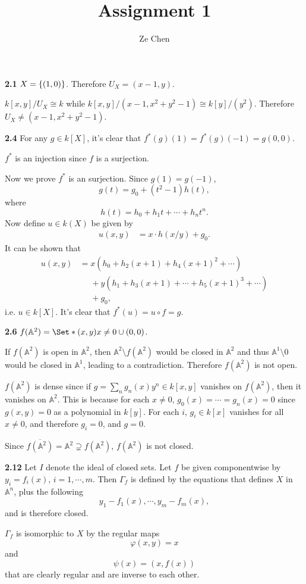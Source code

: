 \documentclass{article}
\title{Assignment 1}
\author{Ze Chen}
\makeatletter
\newcommand*{\shifttext}[1]{%
  \settowidth{\@tempdima}{#1}%
  \hspace{-\@tempdima}#1%
}
\newcommand{\plabel}[1]{%
\shifttext{\textbf{#1}\quad}%
}
\makeatother
\begin{document}
\maketitle

\plabel{2.1}%
$X = \qty{(1,0)}$.
Therefore $U_X = (x-1,y)$.
\par
$k[x,y]/U_X \cong k$ while $k[x,y]/(x-1, x^2+y^2-1) \cong k[y]/(y^2)$.
Therefore $U_X \neq (x-1,x^2+y^2-1)$.

\plabel{2.4}%
For any $g\in k[X]$, it's clear that $f^*(g)(1) = f^*(g)(-1) = g(0,0)$.
\par
$f^*$ is an injection since $f$ is a surjection.
\par
Now we prove $f^*$ is an surjection.
Since $g(1) = g(-1)$,
\[ g(t) = g_0 + (t^2 - 1)h(t), \]
where
\[ h(t) = h_0 + h_1 t + \cdots + h_n t^n. \]
Now define $u\in k(X)$ be given by
\begin{align*}
    u(x,y) &= x \cdot h(x/y) + g_0.
\end{align*}
It can be shown that
\begin{align*}
    u(x,y) &= x(h_0 + h_2(x+1) + h_4(x+1)^2 + \cdots) \\
    &\phantom{{}={}} + y(h_1 + h_3(x+1) + \cdots + h_5(x+1)^3 + \cdots) \\
    &\phantom{{}={}} + g_0,
\end{align*}
i.e. $u\in k[X]$.
It's clear that $f^*(u) = u\circ f = g$.

\plabel{2.6}%
$f(\mathbb{A}^2) = \Set*{(x,y)}{x\neq 0} \cup (0,0)$.
\par
If $f(\mathbb{A}^2)$ is open in $\mathbb{A}^2$, then $\mathbb{A}^2 \setminus f(\mathbb{A}^2)$ would be closed in $\mathbb{A}^2$ and thus $\mathbb{A}^1 \setminus \qty{0}$ would be closed in $\mathbb{A}^1$, leading to a contradiction.
Therefore $f(\mathbb{A}^2)$ is not open.
\par
$f(\mathbb{A}^2)$ is dense since if $g = \sum_n g_n(x) y^n\in k[x,y]$ vanishes on $f(\mathbb{A}^2)$, then it vanishes on $\mathbb{A}^2$.
This is because for each $x\neq 0$, $g_0(x) = \cdots = g_n(x) = 0$ since $g(x,y) = 0$ as a polynomial in $k[y]$.
For each $i$, $g_i\in k[x]$ vanishes for all $x\neq 0$, and therefore $g_i = 0$, and $g=0$.
\par
Since $\overline{f(\mathbb{A}^2)} = \mathbb{A}^2 \supsetneq f(\mathbb{A}^2)$, $f(\mathbb{A}^2)$ is not closed.

\plabel{2.12}%
Let $I$ denote the ideal of closed sets.
Let $f$ be given componentwise by $y_i = f_i(x)$, $i=1,\cdots,m$.
Then $\Gamma_f$ is defined by the equations that defines $X$ in $\mathbb{A}^n$, plus the following
\[ y_1 - f_1(x),\cdots,y_m - f_m(x), \]
and is therefore closed.
\par
$\Gamma_f$ is isomorphic to $X$ by the regular maps
\[ \varphi(x,y) = x \]
and
\[ \psi(x) = (x,f(x)) \]
that are clearly regular and are inverse to each other.
\end{document}
